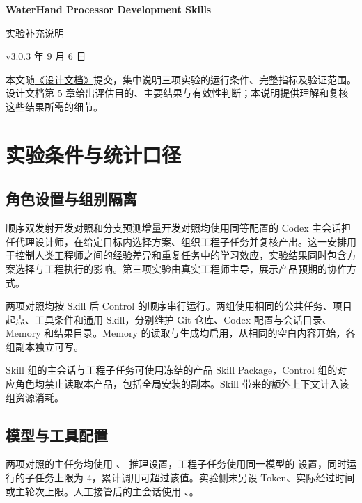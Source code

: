 \documentclass[UTF8,fontset=none,zihao=-4,a4paper]{ctexart}
\begin{document}
\small
{}
\setlength{\LTpre}{5pt}
\setlength{\LTpost}{5pt}
\begin{center}
{\sffamily\bfseries\large WaterHand Processor Development Skills\par}
\vspace{5mm}
{\heiti\LARGE 实验补充说明\par}
\vspace{3mm}
{\small v3.0.3 年 9 月 6 日\par}
\end{center}
\vspace{3mm}
本文随\href{DESIGN_REPORT.pdf}{《设计文档》}提交，集中说明三项实验的运行条件、完整指标及验证范围。设计文档第 5 章给出评估目的、主要结果与有效性判断；本说明提供理解和复核这些结果所需的细节。

\section{实验条件与统计口径}

\subsection{角色设置与组别隔离}

顺序双发射开发对照和分支预测增量开发对照均使用同等配置的 Codex 主会话担任代理设计师，在给定目标内选择方案、组织工程子任务并复核产出。这一安排用于控制人类工程师之间的经验差异和重复任务中的学习效应，实验结果同时包含方案选择与工程执行的影响。第三项实验由真实工程师主导，展示产品预期的协作方式。

两项对照均按 Skill 后 Control 的顺序串行运行。两组使用相同的公共任务、项目起点、工具条件和通用 Skill，分别维护 Git 仓库、Codex 配置与会话目录、Memory 和结果目录。Memory 的读取与生成均启用，从相同的空白内容开始，各组副本独立可写。

Skill 组的主会话与工程子任务可使用冻结的产品 Skill Package，Control 组的对应角色均禁止读取本产品，包括全局安装的副本。Skill 带来的额外上下文计入该组资源消耗。

\subsection{模型与工具配置}

两项对照的主任务均使用 、 推理设置，工程子任务使用同一模型的  设置，同时运行的子任务上限为 4，累计调用可超过该值。实验侧未另设 Token、实际经过时间或主轮次上限。人工接管后的主会话使用 、。
\end{document}
